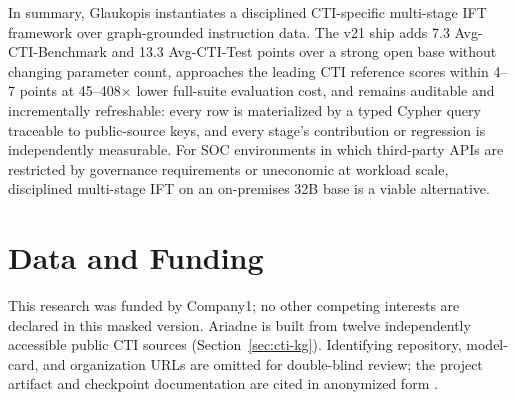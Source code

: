 \documentclass[conference]{IEEEtran}
\begin{document}
In summary, Glaukopis instantiates a disciplined CTI-specific multi-stage IFT framework over graph-grounded instruction data. The v21 ship adds 7.3 Avg-CTI-Benchmark and 13.3 Avg-CTI-Test points over a strong open base without changing parameter count, approaches the leading CTI reference scores within 4--7 points at 45--408$\times$ lower full-suite evaluation cost, and remains auditable and incrementally refreshable: every row is materialized by a typed Cypher query traceable to public-source keys, and every stage's contribution or regression is independently measurable. For SOC environments in which third-party APIs are restricted by governance requirements or uneconomic at workload scale, disciplined multi-stage IFT on an on-premises 32B base is a viable alternative.

\section*{Data and Funding}
This research was funded by Company1; no other competing interests are declared in this masked version. Ariadne is built from twelve independently accessible public CTI sources (Section~\ref{sec:cti-kg}). Identifying repository, model-card, and organization URLs are omitted for double-blind review; the project artifact and checkpoint documentation are cited in anonymized form \cite{glaukopis2026repo,glaukopis2026model}.



\end{document}

